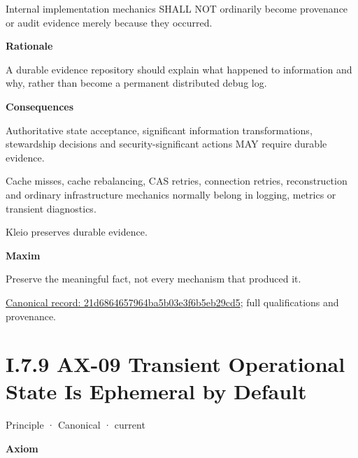 Internal implementation mechanics SHALL NOT ordinarily become provenance
or audit evidence merely because they occurred.



\par\medskip\textbf{Rationale}\par


A durable evidence repository should explain what happened to
information and why, rather than become a permanent distributed debug
log.



\par\medskip\textbf{Consequences}\par


Authoritative state acceptance, significant information transformations,
stewardship decisions and security-significant actions MAY require
durable evidence.



Cache misses, cache rebalancing, CAS retries, connection retries,
reconstruction and ordinary infrastructure mechanics normally belong in
logging, metrics or transient diagnostics.



Kleio preserves durable evidence.



\par\medskip\textbf{Maxim}\par


Preserve the meaningful fact, not every mechanism that produced it.


{\footnotesize \href{../../../../continuum/motivation/principle/21d6864657964ba5b03e3f6b5eb29cd5.md}{Canonical record: 21d6864657964ba5b03e3f6b5eb29cd5}; full qualifications and provenance.}\par
\section*{I.7.9 AX-09 Transient Operational State Is Ephemeral by Default}
\label{navigation:I.7.9}

\label{element:9a5cb9e8876844e58e660f909f7df9fc}
{\small Principle · Canonical · current}\par

\par\medskip\textbf{Axiom}\par


